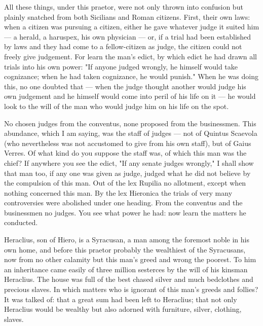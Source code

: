  All these things, under this praetor, were not only thrown into confusion but plainly snatched from both Sicilians and Roman citizens. First, their own laws: when a citizen was pursuing a citizen, either he gave whatever judge it suited him --- a herald, a haruspex, his own physician --- or, if a trial had been established by laws and they had come to a fellow-citizen as judge, the citizen could not freely give judgement. For learn the man's edict, by which edict he had drawn all trials into his own power: "If anyone judged wrongly, he himself would take cognizance; when he had taken cognizance, he would punish." When he was doing this, no one doubted that --- when the judge thought another would judge his own judgement and he himself would come into peril of his life on it --- he would look to the will of the man who would judge him on his life on the spot.

 No chosen judges from the conventus, none proposed from the businessmen. This abundance, which I am saying, was the staff of judges --- not of Quintus Scaevola (who nevertheless was not accustomed to give from his own staff), but of Gaius Verres. Of what kind do you suppose the staff was, of which this man was the chief? If anywhere you see the edict, "If any senate judges wrongly," I shall show that man too, if any one was given as judge, judged what he did not believe by the compulsion of this man. Out of the lex Rupilia no allotment, except when nothing concerned this man. By the lex Hieronica the trials of very many controversies were abolished under one heading. From the conventus and the businessmen no judges. You see what power he had: now learn the matters he conducted.

 Heraclius, son of Hiero, is a Syracusan, a man among the foremost noble in his own home, and before this praetor probably the wealthiest of the Syracusans, now from no other calamity but this man's greed and wrong the poorest. To him an inheritance came easily of three million sesterces by the will of his kinsman Heraclius. The house was full of the best chased silver and much bedclothes and precious slaves. In which matters who is ignorant of this man's greeds and follies? It was talked of: that a great sum had been left to Heraclius; that not only Heraclius would be wealthy but also adorned with furniture, silver, clothing, slaves.

